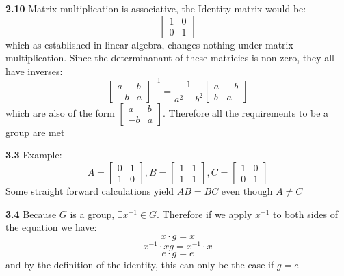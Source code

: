 \documentclass[12pt]{article}
\newenvironment{ques}{\vspace{2 ex}}{\vspace{2 ex}}
\theoremstyle{definition}
\begin{document}
\begin{ques}
	\textbf{2.10}
		Matrix multiplication is associative, the Identity matrix would be:
		$$\left[ \begin{matrix}
			1 & 0 \\
			0 & 1 
		\end{matrix} \right ]$$
		which as established in linear algebra, changes nothing under
		matrix multiplication. Since the determinanant of these
		matricies is non-zero, they all have inverses:
		$$\left[ \begin{matrix}
			a & b \\
			-b & a 
		\end{matrix} \right ]^{-1}
		=
		\frac{1}{a^2 + b^2}
		\left[ \begin{matrix}
			a & -b \\
			b & a 
		\end{matrix} \right ]$$
		which are also of the form $\left[ \begin{matrix}
			a & b \\
			-b & a 
		\end{matrix} \right ]$. Therefore all the requirements to be a
		group are met
\end{ques}

\begin{ques}
	\textbf{3.3}
	Example:
		$$A = \left[ \begin{matrix}
			0 & 1\\
			1 & 0
		\end{matrix} \right ],
		B = \left[ \begin{matrix}
			1 & 1\\
			1 & 1
		\end{matrix} \right ],
		C = \left[ \begin{matrix}
			1 & 0\\
			0 & 1
		\end{matrix} \right ]$$
		Some straight forward calculations yield $AB = BC$ even though $A \neq C$
\end{ques}

\begin{ques}
	\textbf{3.4}
		Because $G$ is a group, $\exists x^{-1} \in G$. Therefore if we apply
		$x^{-1}$ to both sides of the equation we have:
		$$x \cdot g = x$$
		$$x^{-1} \cdot x g = x^{-1}\cdot x$$
		$$e \cdot g = e$$
		and by the definition of the identity, this can only be the case if $g = e$

\end{ques}
\end{document}
